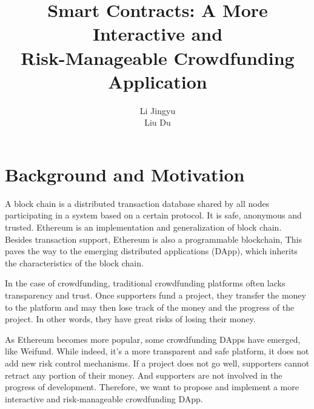 \documentclass{article}
\title{Smart Contracts: A More Interactive and\\ Risk-Manageable Crowdfunding Application}
\author{Li Jingyu\quad 517030910318\\Liu Du\quad 517030910346}
\begin{document}
\maketitle

\newcommand{\vecb}[2]{\boldsymbol{#1}^{(#2)}}
\newcommand{\code}[1]{{\ttfamily #1}}

\tableofcontents

\section{Background and Motivation}
A block chain is a distributed transaction database shared by all nodes participating in a system based on a certain protocol. It is safe, anonymous and trusted. Ethereum is an implementation and generalization of block chain. Besides transaction support, Ethereum is also a programmable blockchain, This paves the way to the emerging distributed applications (DApp), which inherits the characteristics of the block chain.

In the case of crowdfunding, traditional crowdfunding platforms often lacks transparency and trust. Once supporters fund a project, they transfer the money to the platform and may then lose track of the money and the progress of the project. In other words, they have great risks of losing their money.

As Ethereum becomes more popular, some crowdfunding DApps have emerged, like Weifund. While indeed, it's a more transparent and safe platform, it does not add new risk control mechanisms. If a project does not go well, supporters cannot retract any portion of their money. And supporters are not involved in the progress of development. Therefore, we want to propose and implement a more interactive and risk-manageable crowdfunding DApp.
\end{document}
